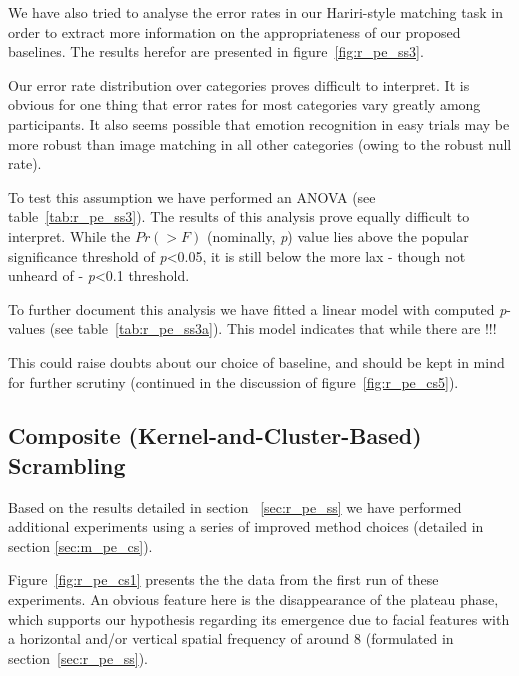 	    We have also tried to analyse the error rates in our Hariri-style matching task in order to extract more information on the appropriateness of our proposed baselines.
	    The results herefor are presented in figure~\ref{fig:r_pe_ss3}.

	    Our error rate distribution over categories proves difficult to interpret.
	    It is obvious for one thing that error rates for most categories vary greatly among participants.
	    It also seems possible that emotion recognition in easy trials may be more robust than image matching in all other categories (owing to the robust null rate).
	    
	    To test this assumption we have performed an ANOVA (see table~\ref{tab:r_pe_ss3}).
	    The results of this analysis prove equally difficult to interpret. While the $Pr(>F)$ (nominally, \textit{p}) value lies above the popular significance threshold of \textit{p}<0.05, 
	    it is still below the more lax - though not unheard of - \textit{p}<0.1 threshold.
	    
	    To further document this analysis we have fitted a linear model with computed \textit{p}-values (see table~\ref{tab:r_pe_ss3a}).
	    This model indicates that while there are !!!

	    This could raise doubts about our choice of baseline, and should be kept in mind for further scrutiny (continued in the discussion of figure~\ref{fig:r_pe_cs5}).
	\subsection{Composite (Kernel-and-Cluster-Based) Scrambling}\label{sec:r_pe_cs}
	    Based on the results detailed in section ~\ref{sec:r_pe_ss} we have performed additional experiments using a series of improved method choices (detailed in section \ref{sec:m_pe_cs}).
	    
	    Figure~\ref{fig:r_pe_cs1} presents the the data from the first run of these experiments.
	    An obvious feature here is the disappearance of the plateau phase, which supports our hypothesis regarding its emergence due to facial features with a horizontal and/or vertical spatial frequency of around \SI{8}{\pixel} (formulated in section~\ref{sec:r_pe_ss}).
	    
